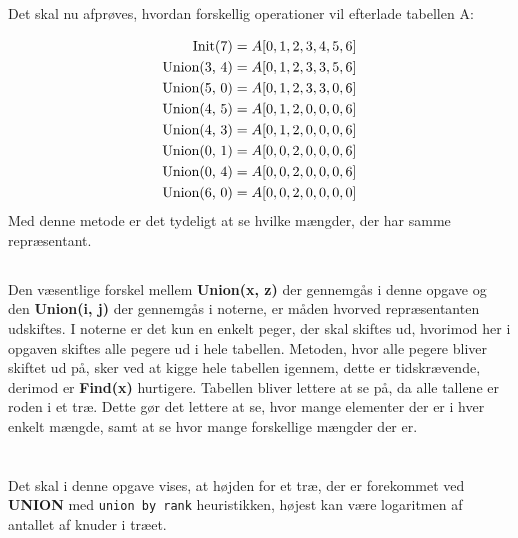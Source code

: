 \documentclass[a4paper,10pt]{article}
\begin{document}
\subsection{}
Det skal nu afprøves, hvordan forskellig operationer vil efterlade tabellen A:

\begin{equation*}
\begin{split}
    \textnormal{Init(7)} &= A[0, 1, 2, 3, 4, 5, 6]\\
    \textnormal{Union(3, 4)} &= A[0, 1, 2, 3, 3, 5, 6]\\
    \textnormal{Union(5, 0)} &= A[0, 1, 2, 3, 3, 0, 6]\\
    \textnormal{Union(4, 5)} &= A[0, 1, 2, 0, 0, 0, 6]\\
    \textnormal{Union(4, 3)} &= A[0, 1, 2, 0, 0, 0, 6]\\
    \textnormal{Union(0, 1)} &= A[0, 0, 2, 0, 0, 0, 6]\\
    \textnormal{Union(0, 4)} &= A[0, 0, 2, 0, 0, 0, 6]\\
    \textnormal{Union(6, 0)} &= A[0, 0, 2, 0, 0, 0, 0]\\
\end{split}    
\end{equation*}
Med denne metode er det tydeligt at se hvilke mængder, der har samme repræsentant.
\subsection{}
Den væsentlige forskel mellem \textbf{Union(x, z)} der gennemgås i denne opgave og den \textbf{Union(i, j)} der gennemgås i noterne, er måden hvorved repræsentanten udskiftes. I noterne er det kun en enkelt peger, der skal skiftes ud, hvorimod her i opgaven skiftes alle pegere ud i hele tabellen. Metoden, hvor alle pegere bliver skiftet ud på, sker ved at kigge hele tabellen igennem, dette er tidskrævende, derimod er \textbf{Find(x)} hurtigere. Tabellen bliver lettere at se på, da alle tallene er roden i et træ. Dette gør det lettere at se, hvor mange elementer der er i hver enkelt mængde, samt at se hvor mange forskellige mængder der er.

\newpage
\section{}
Det skal i denne opgave vises, at højden for et træ, der er forekommet ved \textbf{UNION} med \texttt{union by rank} heuristikken, højest kan være logaritmen af antallet af knuder i træet. 
\end{document}
